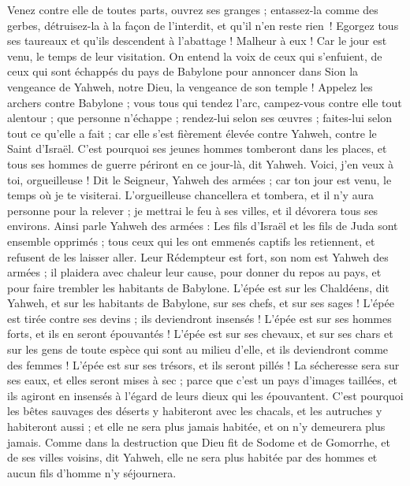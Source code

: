 \begin{multicols}{2}
Venez contre elle de toutes parts, ouvrez ses granges ; entassez-la comme des gerbes, détruisez-la à la façon de l’interdit, et qu’il n’en reste rien !
Egorgez tous ses taureaux et qu'ils descendent à l'abattage ! Malheur à eux ! Car le jour est venu, le temps de leur visitation.
On entend la voix de ceux qui s'enfuient, de ceux qui sont échappés du pays de Babylone pour annoncer dans Sion la vengeance de Yahweh, notre Dieu, la vengeance de son temple !
Appelez les archers contre Babylone ; vous tous qui tendez l'arc, campez-vous contre elle tout alentour ; que personne n'échappe ; rendez-lui selon ses œuvres ; faites-lui selon tout ce qu'elle a fait ; car elle s'est fièrement élevée contre Yahweh, contre le Saint d'Israël.
C'est pourquoi ses jeunes hommes tomberont dans les places, et tous ses hommes de guerre périront en ce jour-là, dit Yahweh.
Voici, j'en veux à toi, orgueilleuse ! Dit le Seigneur, Yahweh des armées ; car ton jour est venu, le temps où je te visiterai.
L'orgueilleuse chancellera et tombera, et il n'y aura personne pour la relever ; je mettrai le feu à ses villes, et il dévorera tous ses environs.
Ainsi parle Yahweh des armées : Les fils d'Israël et les fils de Juda sont ensemble opprimés ; tous ceux qui les ont emmenés captifs les retiennent, et refusent de les laisser aller.
Leur Rédempteur est fort, son nom est Yahweh des armées ; il plaidera avec chaleur leur cause, pour donner du repos au pays, et pour faire trembler les habitants de Babylone.
L'épée est sur les Chaldéens, dit Yahweh, et sur les habitants de Babylone, sur ses chefs, et sur ses sages !
L'épée est tirée contre ses devins ; ils deviendront insensés ! L'épée est sur ses hommes forts, et ils en seront épouvantés !
L'épée est sur ses chevaux, et sur ses chars et sur les gens de toute espèce qui sont au milieu d’elle, et ils deviendront comme des femmes ! L'épée est sur ses trésors, et ils seront pillés !
La sécheresse sera sur ses eaux, et elles seront mises à sec ; parce que c'est un pays d'images taillées, et ils agiront en insensés à l'égard de leurs dieux qui les épouvantent.
C'est pourquoi les bêtes sauvages des déserts y habiteront avec les chacals, et les autruches y habiteront aussi ; et elle ne sera plus jamais habitée, et on n'y demeurera plus jamais.
Comme dans la destruction que Dieu fit de Sodome et de Gomorrhe, et de ses villes voisins, dit Yahweh, elle ne sera plus habitée par des hommes et aucun fils d'homme n'y séjournera.

\end{multicols}
